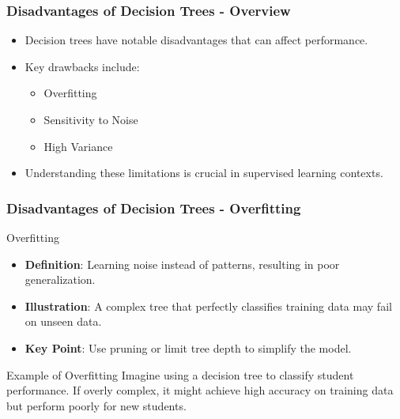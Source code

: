 \documentclass[aspectratio=169]{beamer}
\begin{document}
\begin{frame}[fragile]
    \frametitle{Disadvantages of Decision Trees - Overview}
    \begin{itemize}
        \item Decision trees have notable disadvantages that can affect performance.
        \item Key drawbacks include:
        \begin{itemize}
            \item Overfitting
            \item Sensitivity to Noise
            \item High Variance
        \end{itemize}
        \item Understanding these limitations is crucial in supervised learning contexts.
    \end{itemize}
\end{frame}

\begin{frame}[fragile]
    \frametitle{Disadvantages of Decision Trees - Overfitting}
    \begin{block}{Overfitting}
        \begin{itemize}
            \item \textbf{Definition}: Learning noise instead of patterns, resulting in poor generalization.
            \item \textbf{Illustration}: A complex tree that perfectly classifies training data may fail on unseen data.
            \item \textbf{Key Point}: Use pruning or limit tree depth to simplify the model.
        \end{itemize}
    \end{block}
    
    \begin{block}{Example of Overfitting}
        Imagine using a decision tree to classify student performance. If overly complex, it might achieve high accuracy on training data but perform poorly for new students.
    \end{block}
\end{frame}
\end{document}
